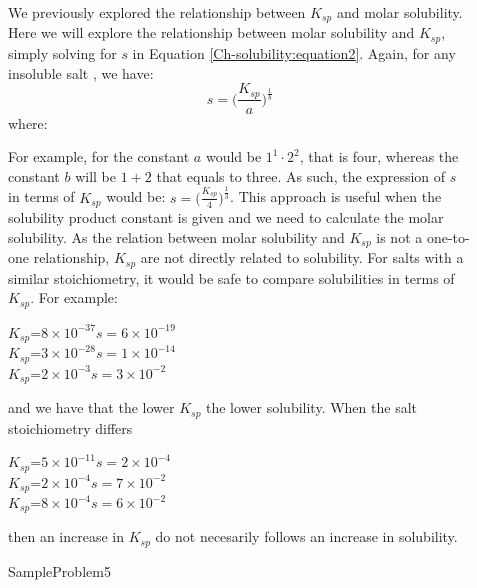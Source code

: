 \documentclass[main.tex]{subfiles}
\newcommand\chapterlabel{Ch-solubility}\setcounter{figurenewcounter}{0}\setcounter{tablenewcounter}{0}\setcounter{formulanewcounter}{0}
\begin{document}
\begin{description}
\item[] We previously explored the relationship between $K_{sp}$ and molar solubility. Here we will explore the relationship between molar solubility and $K_{sp}$, simply solving for $s$ in Equation \ref{\chapterlabel:equation2}. Again, for any insoluble salt , we have:
\begin{equation}
\boxed{ s= \Big( \frac{K_{sp}}{a} \Big)^{\frac{1}{b}}  }\label{\chapterlabel:equation3}
\end{equation}
where:
For example, for  the constant $a$ would be $1^1\cdot 2^2$, that is four, whereas the constant $b$ will be $1+2$ that equals to three. As such, the expression of $s$ in terms of $K_{sp}$ would be: $s= \big( \frac{K_{sp}}{4} \big)^{\frac{1}{3}} $. This approach is useful when the solubility product constant is given and we need to calculate the molar solubility.
As the relation between molar solubility and $K_{sp}$ is not a one-to-one relationship, $K_{sp}$ are not directly related to solubility. For salts with a similar stoichiometry, it would be safe to compare solubilities in terms of $K_{sp}$. For example:
\begin{center}
	\hfill	$K_{sp}$=$8\times10^{-37}$\hfill$s=6\times10^{-19}$\\
	\hfill	$K_{sp}$=$3\times10^{-28}$\hfill$s=1\times10^{-14}$\\
	\hfill	$K_{sp}$=$2\times10^{-3}$\hfill$s=3\times10^{-2}$
\end{center}
and we have that the lower $K_{sp}$ the lower solubility. When the salt stoichiometry differs
\begin{center}
	\hfill	$K_{sp}$=$5\times10^{-11}$\hfill$s=2\times10^{-4}$\\
	\hfill	$K_{sp}$=$2\times10^{-4}$\hfill$s=7\times10^{-2}$\\
	\hfill	$K_{sp}$=$8\times10^{-4}$\hfill$s=6\times10^{-2}$\\
\end{center}
then an increase in $K_{sp}$ do not necesarily follows an increase in solubility.



  {SampleProblem5}


\end{description}
\end{document}
